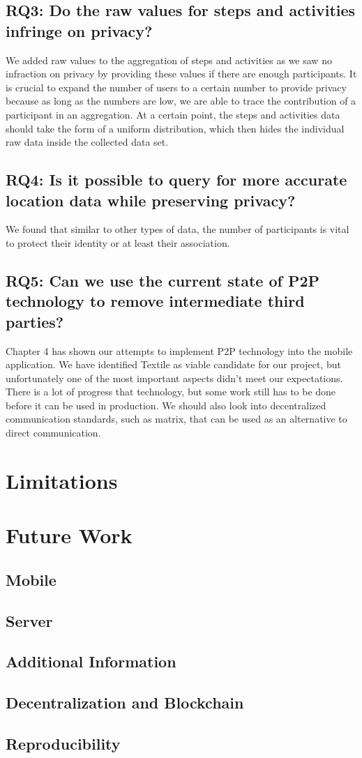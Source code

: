 \subsection*{RQ3: Do the raw values for steps and activities infringe on privacy?}
We added raw values to the aggregation of steps and activities as we saw no infraction on privacy by providing these values if there are enough participants. It is crucial to expand the number of users to a certain number to provide privacy because as long as the numbers are low, we are able to trace the contribution of a participant in an aggregation. At a certain point, the steps and activities data should take the form of a uniform distribution, which then hides the individual raw data inside the collected data set. 

\subsection*{RQ4: Is it possible to query for more accurate location data while preserving privacy?}
We found that similar to other types of data, the number of participants is vital to protect their identity or at least their association. 

\subsection*{RQ5: Can we use the current state of P2P technology to remove intermediate third parties?}
Chapter 4 has shown our attempts to implement P2P technology into the mobile application. We have identified Textile as viable candidate for our project, but unfortunately one of the most important aspects didn't meet our expectations. There is a lot of progress that technology, but some work still has to be done before it can be used in production. We should also look into decentralized communication standards, such as matrix, that can be used as an alternative to direct communication.

\section{Limitations}
\section{Future Work}
\subsection{Mobile}
\subsection{Server}
\subsection{Additional Information}
\subsection{Decentralization and Blockchain}
\subsection{Reproducibility}
